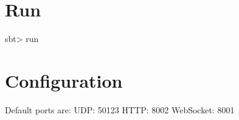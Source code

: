 \section*{Run}

sbt> run

\section*{Configuration}

Default ports are:
UDP: 50123
HTTP: 8002
WebSocket: 8001
